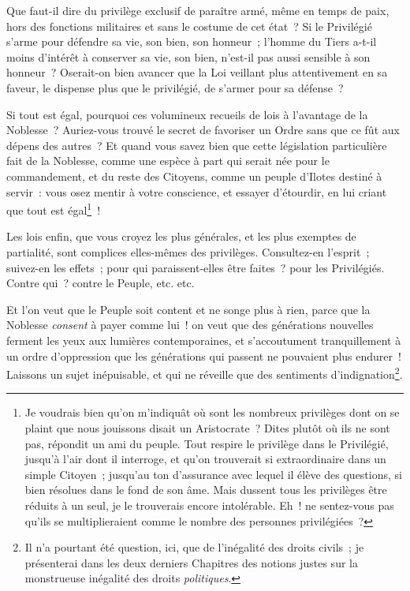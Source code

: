 \documentclass[french,twoside]{book} %
\begin{document}
Que faut-il dire du privilège exclusif de paraître armé, même en temps de paix, hors des fonctions militaires et sans le costume de cet état ? Si le Privilégié s’arme pour défendre sa vie, son bien, son honneur ; l’homme du Tiers a-t-il moins d’intérêt à conserver sa vie, son bien, n’est-il pas aussi sensible à son honneur ? Oserait-on bien avancer que la Loi veillant plus attentivement en sa faveur, le dispense plus que le privilégié, de s’armer pour sa défense ?\par
Si tout est égal, pourquoi ces volumineux recueils de lois à l’avantage de la Noblesse ? Auriez-vous trouvé le secret de favoriser un Ordre sans que ce fût aux dépens des autres ? Et quand vous savez bien que cette législation particulière fait de la Noblesse, comme une espèce à part qui serait née pour le commandement, et du reste des Citoyens, comme un peuple d’Ilotes destiné à servir : vous osez mentir à votre conscience, et essayer d’étourdir, en lui criant que tout est égal\footnote{Je voudrais bien qu’on m’indiquât où sont les nombreux privilèges dont on se plaint que nous jouissons disait un Aristocrate ? Dites plutôt où ils ne sont pas, répondit un ami du peuple. Tout respire le privilège dans le Privilégié, jusqu’à l’air dont il interroge, et qu’on trouverait si extraordinaire dans un simple Citoyen ; jusqu’au ton d’assurance avec lequel il élève des questions, si bien résolues dans le fond de son âme. Mais dussent tous les privilèges être réduits à un seul, je le trouverais encore intolérable. Eh ! ne sentez-vous pas qu’ils se multiplieraient comme le nombre des personnes privilégiées ?} !\par
Les lois enfin, que vous croyez les plus générales, et les plus exemptes de partialité, sont complices elles-mêmes des privilèges. Consultez-en l’esprit ; suivez-en les effets ; pour qui paraissent-elles être faites ? pour les Privilégiés. Contre qui ? contre le Peuple, etc. etc.\par
Et l’on veut que le Peuple soit content et ne songe plus à rien, parce que la Noblesse {\itshape consent} à payer comme lui ! on veut que des générations nouvelles ferment les yeux aux lumières contemporaines, et s’accoutument tranquillement à un ordre d’oppression que les générations qui passent ne pouvaient plus endurer ! Laissons un sujet inépuisable, et qui ne réveille que des sentiments d’indignation\footnote{Il n’a pourtant été question, ici, que de l’inégalité des droits civils ; je présenterai dans les deux derniers Chapitres des notions justes sur la monstrueuse inégalité des droits {\itshape politiques}.}.\par
\end{document}
